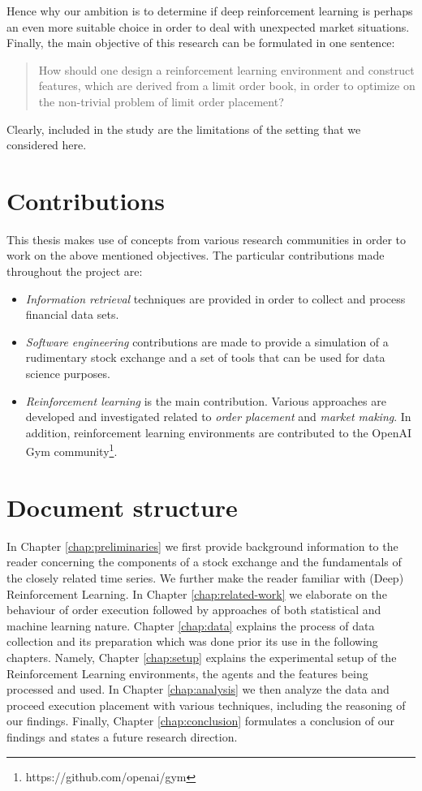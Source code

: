 Hence why our ambition is to determine if deep reinforcement learning is perhaps an even more suitable choice in order to deal with unexpected market situations.
Finally, the main objective of this research can be formulated in one sentence:
\begin{quote}
    How should one design a reinforcement learning environment and construct features, which are derived from a limit order book, in order to optimize on the non-trivial problem of limit order placement?
\end{quote}
Clearly, included in the study are the limitations of the setting that we considered here.

\section{Contributions}

This thesis makes use of concepts from various research communities in order to work on the above mentioned objectives.
The particular contributions made throughout the project are:
\begin{itemize}
    \item \textit{Information retrieval} techniques are provided in order to collect and process financial data sets.
    \item \textit{Software engineering} contributions are made to provide a simulation of a rudimentary stock exchange and a set of tools that can be used for data science purposes.
    \item \textit{Reinforcement learning} is the main contribution.
    Various approaches are developed and investigated related to \textit{order placement} and \textit{market making}.
    In addition, reinforcement learning environments are contributed to the OpenAI Gym community\footnote{https://github.com/openai/gym}.
\end{itemize}


\section{Document structure}

In Chapter \ref{chap:preliminaries} we first provide background information to the reader concerning the components of a stock exchange and the fundamentals of the closely related time series.
We further make the reader familiar with (Deep) Reinforcement Learning.
In Chapter \ref{chap:related-work} we elaborate on the behaviour of order execution followed by approaches of both statistical and machine learning nature.
Chapter \ref{chap:data} explains the process of data collection and its preparation which was done prior its use in the following chapters.
Namely, Chapter \ref{chap:setup} explains the experimental setup of the Reinforcement Learning environments, the agents and the features being processed and used.
In Chapter \ref{chap:analysis} we then analyze the data and proceed execution placement with various techniques, including the reasoning of our findings.
Finally, Chapter \ref{chap:conclusion} formulates a conclusion of our findings and states a future research direction.
